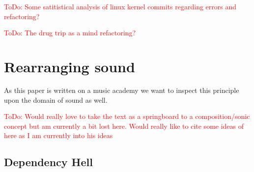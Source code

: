 \documentclass[10pt,twocolumn,letterpaper]{article}
\newcommand\todo[1]{\textcolor{red}{ToDo: #1}}
\begin{document}
\todo{Some satitistical analysis of linux kernel commits regarding errors and refactoring?}

\todo{The drug trip as a mind refactoring?}


\section{Rearranging sound}

As this paper is written on a music academy we want to inspect this principle upon the domain of sound as well. 

\todo{Would really love to take the text as a springboard to a composition/sonic concept but am currently a bit lost here. Would really like to cite some ideas of \cite{Xenakis_1992} here as I am currently into his ideas}

\subsection{Dependency Hell}



\end{document}
